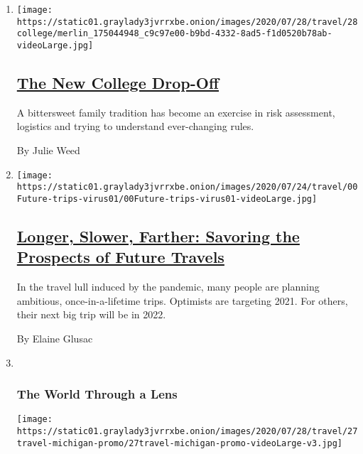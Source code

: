 \begin{enumerate}
\def\labelenumi{\arabic{enumi}.}
\item
  \texttt{[image: https://static01.graylady3jvrrxbe.onion/images/2020/07/28/travel/28college/merlin\_175044948\_c9c97e00-b9bd-4332-8ad5-f1d0520b78ab-videoLarge.jpg]}

  \hypertarget{the-new-college-drop-off}{%
  \subsection{\texorpdfstring{\href{/2020/07/29/travel/virus-college-travel-restrictions.html}{The
  New College
  Drop-Off}}{The New College Drop-Off}}\label{the-new-college-drop-off}}

  A bittersweet family tradition has become an exercise in risk
  assessment, logistics and trying to understand ever-changing rules.

  By Julie Weed
\item
  \texttt{[image: https://static01.graylady3jvrrxbe.onion/images/2020/07/24/travel/00Future-trips-virus01/00Future-trips-virus01-videoLarge.jpg]}

  \hypertarget{longer-slower-farther-savoring-the-prospects-of-future-travels}{%
  \subsection{\texorpdfstring{\href{/2020/07/28/travel/future-travel-bucket-list-coronavirus.html}{Longer,
  Slower, Farther: Savoring the Prospects of Future
  Travels}}{Longer, Slower, Farther: Savoring the Prospects of Future Travels}}\label{longer-slower-farther-savoring-the-prospects-of-future-travels}}

  In the travel lull induced by the pandemic, many people are planning
  ambitious, once-in-a-lifetime trips. Optimists are targeting 2021. For
  others, their next big trip will be in 2022.

  By Elaine Glusac
\item ~
  \hypertarget{the-world-through-a-lens-1}{%
  \subsubsection{The World Through a
  Lens}\label{the-world-through-a-lens-1}}

  \texttt{[image: https://static01.graylady3jvrrxbe.onion/images/2020/07/28/travel/27travel-michigan-promo/27travel-michigan-promo-videoLarge-v3.jpg]}


\end{enumerate}
